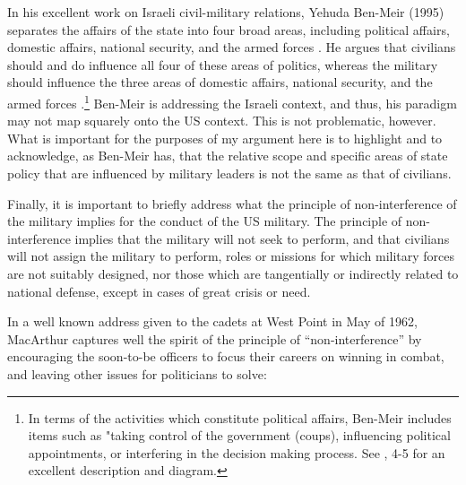 \documentclass[
  12pt,
  oneside]{memoir}
\begin{document}
In his excellent work on Israeli civil-military relations, Yehuda Ben-Meir (1995) separates the affairs of the state into four broad areas, including political affairs, domestic affairs, national security, and the armed forces \autocite{ben-meir_civil-military_1995}. He argues that civilians should and do influence all four of these areas of politics, whereas the military should influence the three areas of domestic affairs, national security, and the armed forces \autocite{ben-meir_civil-military_1995}.\footnote{In terms of the activities which constitute political affairs, Ben-Meir includes items such as "taking control of the government (coups), influencing political appointments, or interfering in the decision making process. See \textcite{ben-meir_civil-military_1995}, 4-5 for an excellent description and diagram.} Ben-Meir is addressing the Israeli context, and thus, his paradigm may not map squarely onto the US context. This is not problematic, however. What is important for the purposes of my argument here is to highlight and to acknowledge, as Ben-Meir has, that the relative scope and specific areas of state policy that are influenced by military leaders is not the same as that of civilians.

Finally, it is important to briefly address what the principle of non-interference of the military implies for the conduct of the US military. The principle of non-interference implies that the military will not seek to perform, and that civilians will not assign the military to perform, roles or missions for which military forces are not suitably designed, nor those which are tangentially or indirectly related to national defense, except in cases of great crisis or need.

In a well known address given to the cadets at West Point in May of 1962, MacArthur captures well the spirit of the principle of ``non-interference'' by encouraging the soon-to-be officers to focus their careers on winning in combat, and leaving other issues for politicians to solve:

\SingleSpacing
\end{document}
